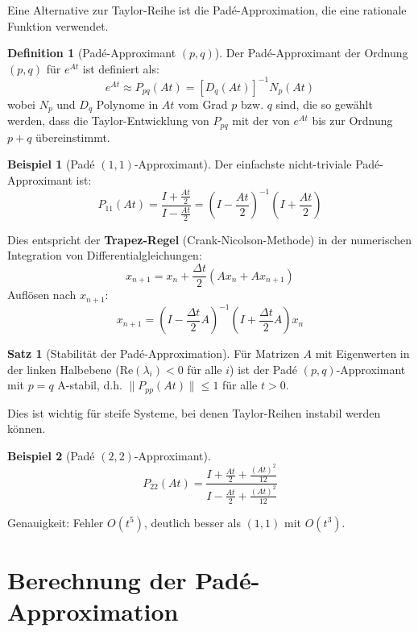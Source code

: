\documentclass[a4paper,12pt]{report}
\theoremstyle{definition}
\newtheorem{definition}{Definition}
\newtheorem{beispiel}{Beispiel}
\newtheorem{satz}{Satz}
\begin{document}
	Eine Alternative zur Taylor-Reihe ist die Padé-Approximation, die eine rationale Funktion verwendet.
	
	\begin{definition}[Padé-Approximant $(p,q)$]
		Der Padé-Approximant der Ordnung $(p,q)$ für $e^{At}$ ist definiert als:
		\[
		e^{At} \approx P_{pq}(At) = \left[ D_q(At) \right]^{-1} N_p(At)
		\]
		wobei $N_p$ und $D_q$ Polynome in $At$ vom Grad $p$ bzw. $q$ sind, die so gewählt werden, dass die Taylor-Entwicklung von $P_{pq}$ mit der von $e^{At}$ bis zur Ordnung $p+q$ übereinstimmt.
	\end{definition}
	
	\begin{beispiel}[Padé $(1,1)$-Approximant]
		Der einfachste nicht-triviale Padé-Approximant ist:
		\[
		P_{11}(At) = \frac{I + \frac{At}{2}}{I - \frac{At}{2}} = \left(I - \frac{At}{2}\right)^{-1} \left(I + \frac{At}{2}\right)
		\]
		
		Dies entspricht der \textbf{Trapez-Regel} (Crank-Nicolson-Methode) in der numerischen Integration von Differentialgleichungen:
		\[
		x_{n+1} = x_n + \frac{\Delta t}{2}(Ax_n + Ax_{n+1})
		\]
		Auflösen nach $x_{n+1}$:
		\[
		x_{n+1} = \left(I - \frac{\Delta t}{2} A\right)^{-1} \left(I + \frac{\Delta t}{2} A\right) x_n
		\]
	\end{beispiel}
	
	\begin{satz}[Stabilität der Padé-Approximation]
		Für Matrizen $A$ mit Eigenwerten in der linken Halbebene ($\text{Re}(\lambda_i) < 0$ für alle $i$) ist der Padé $(p,q)$-Approximant mit $p = q$ A-stabil, d.h. $\|P_{pp}(At)\| \leq 1$ für alle $t > 0$.
		
		Dies ist wichtig für steife Systeme, bei denen Taylor-Reihen instabil werden können.
	\end{satz}
	
	\begin{beispiel}[Padé $(2,2)$-Approximant]
		\[
		P_{22}(At) = \frac{I + \frac{At}{2} + \frac{(At)^2}{12}}{I - \frac{At}{2} + \frac{(At)^2}{12}}
		\]
		
		Genauigkeit: Fehler $O(t^5)$, deutlich besser als $(1,1)$ mit $O(t^3)$.
	\end{beispiel}
	
	\section{Berechnung der Padé-Approximation}
	
\end{document}
